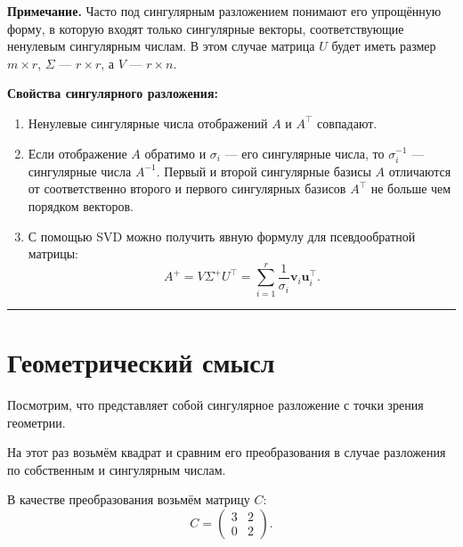 \documentclass[11pt,a4paper]{article}
\providecommand{\tightlist}{%
      \setlength{\itemsep}{0pt}\setlength{\parskip}{0pt}}
\begin{document}
\textbf{Примечание.} Часто под сингулярным разложением понимают его
упрощённую форму, в которую входят только сингулярные векторы,
соответствующие ненулевым сингулярным числам. В этом случае матрица
\(U\) будет иметь размер \(m \times r\), \(\Sigma\) --- \(r \times r\),
а \(V\) --- \(r \times n\).

    \textbf{Свойства сингулярного разложения:}

\begin{enumerate}
\def\labelenumi{\arabic{enumi}.}
\tightlist
\item
  Ненулевые сингулярные числа отображений \(A\) и \(A^\top\) совпадают.
\item
  Если отображение \(A\) обратимо и \(\sigma_i\) --- его сингулярные
  числа, то \(\sigma_i^{-1}\) --- сингулярные числа \(A^{-1}\). Первый и
  второй сингулярные базисы \(A\) отличаются от соответственно второго и
  первого сингулярных базисов \(A^\top\) не больше чем порядком
  векторов.
\item
  С помощью SVD можно получить явную формулу для псевдообратной матрицы:
  \[ A^{+} = V \Sigma^{+} U^\top = \sum_{i=1}^r \frac{1}{\sigma_i} \mathbf{v}_i \mathbf{u}_i^\top. \]
\end{enumerate}

    \begin{center}\rule{0.5\linewidth}{0.5pt}\end{center}

    \hypertarget{ux433ux435ux43eux43cux435ux442ux440ux438ux447ux435ux441ux43aux438ux439-ux441ux43cux44bux441ux43b}{%
\section{Геометрический
смысл}\label{ux433ux435ux43eux43cux435ux442ux440ux438ux447ux435ux441ux43aux438ux439-ux441ux43cux44bux441ux43b}}

Посмотрим, что представляет собой сингулярное разложение с точки зрения
геометрии.

На этот раз возьмём квадрат и сравним его преобразования в случае
разложения по собственным и сингулярным числам.

В качестве преобразования возьмём матрицу \(C\): \[
  C = 
  \begin{pmatrix}
    3 & 2 \\
    0 & 2
  \end{pmatrix}.
\]
\end{document}
